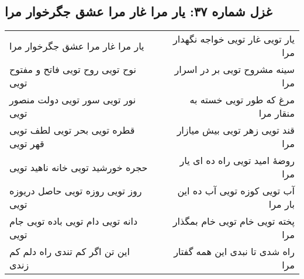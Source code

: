 \begin{center}
\section*{غزل شماره ۳۷: یار مرا غار مرا عشق جگرخوار مرا}
\label{sec:0037}
\begin{longtable}{l p{0.5cm} r}
یار مرا غار مرا عشق جگرخوار مرا
&&
یار تویی غار تویی خواجه نگهدار مرا
\\
نوح تویی روح تویی فاتح و مفتوح تویی
&&
سینه مشروح تویی بر در اسرار مرا
\\
نور تویی سور تویی دولت منصور تویی
&&
مرغ که طور تویی خسته به منقار مرا
\\
قطره تویی بحر تویی لطف تویی قهر تویی
&&
قند تویی زهر تویی بیش میازار مرا
\\
حجره خورشید تویی خانه ناهید تویی
&&
روضهٔ امید تویی راه ده ای یار مرا
\\
روز تویی روزه تویی حاصل دریوزه تویی
&&
آب تویی کوزه تویی آب ده این بار مرا
\\
دانه تویی دام تویی باده تویی جام تویی
&&
پخته تویی خام تویی خام بمگذار مرا
\\
این تن اگر کم تندی راه دلم کم زندی
&&
راه شدی تا نبدی این همه گفتار مرا
\\
\end{longtable}
\end{center}
